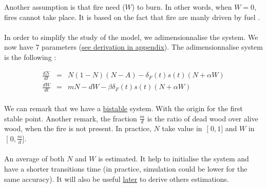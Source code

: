 \documentclass{article}
\begin{document}
Another assumption is that fire need ($W$) to burn. In other words, when $W=0$, fires cannot take place. It is based on the fact that fire are manly driven by fuel \citep{schoennagel_interaction_2004, stephens_effects_2012, syphard_comparing_2011, safford_effects_2009, stephens_experimental_2005}.




\paragraph{}
In order to simplify the study of the model, we adimensionnalise the system. We now have 7 parameters (\hyperref[adim]{see derivation in appendix}). The adimensionnalise system is the following :


\begin{eqnarray}
\frac{dN}{dt} & = & N(1-N)(N-A) - \delta_F(t)s(t)(N+\alpha W) \\
\frac{dW}{dt} & = & mN -dW - \beta\delta_F(t)s(t)(N+\alpha W) 
\end{eqnarray}

\paragraph{} %
We can remark that we have a \hyperref[equi]{bistable} system. With the origin for the first stable point. Another remark, the fraction $\frac{m}{d}$ is the ratio of dead wood over alive wood, when the fire is not present. In practice, $N$ take value in $\mathclose{[}0,1 \mathclose{]} $ and $W$ in $\mathclose{[}0, \frac{m}{d}\mathclose{]}$.









\paragraph{}
\label{average_estimation}
An average of both $N$ and $W$ is estimated. It help to initialise the system and have a shorter transitions time (in practice, simulation could be lower for the same accuracy). It will also be useful \hyperref[estimation]{later} to derive others estimations.
\end{document}
